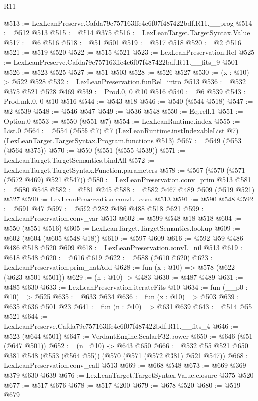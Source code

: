\begin{lexlean}{R11}
\begin{coremodule}
@513 := LexLeanPreserve.Cafda79c757163ffe4c6f07f487422bdf.R11.__prog
@514 := @512 @513
@515 := @514 @375
@516 := LexLeanTarget.TargetSyntax.Value
@517 := @6 @516
@518 := @51 @501
@519 := @517 @518
@520 := @2 @516
@521 := @519 @520
@522 := @515 @521
@523 := LexLeanPreservation.Rel
@525 := LexLeanPreserve.Cafda79c757163ffe4c6f07f487422bdf.R11.__fits_9 @501
@526 := @523 @525
@527 := @51 @503
@528 := @526 @527
@530 := (x : @10) -> @522 @528
@532 := LexLeanPreservation.funRel_intro @513
@536 := @532 @375 @521 @528 @469
@539 := Prod.{0, 0} @10 @516
@540 := @6 @539
@543 := Prod.mk.{0, 0} @10 @516
@544 := @543 @18
@546 := @540 (@544 @518)
@547 := @2 @539
@548 := @546 @547
@549 := @536 @548
@550 := Eq.refl.{1}
@551 := Option.{0}
@553 := @550 (@551 @7)
@554 := LexLeanRuntime.index
@555 := List.{0}
@564 := @554
    (@555 @7)
    @7
    (LexLeanRuntime.instIndexableList @7)
    (LexLeanTarget.TargetSyntax.Program.functions @513)
@567 := @549 (@553 (@564 @375))
@570 := @550 (@551 (@555 @539))
@571 := LexLeanTarget.TargetSemantics.bindAll
@572 := LexLeanTarget.TargetSyntax.Function.parameters
@578 := @567 (@570 (@571 (@572 @469) @521 @547))
@580 := LexLeanPreservation.conv_prim @513
@581 := @580 @548
@582 := @581 @245
@588 := @582 @467 @489 @509 (@519 @521) @527
@590 := LexLeanPreservation.convL_cons @513
@591 := @590 @548
@592 := @591 @47
@597 := @592 @282 @486 @488 @518 @521
@599 := LexLeanPreservation.conv_var @513
@602 := @599 @548 @18 @518
@604 := @550 (@551 @516)
@605 := LexLeanTarget.TargetSemantics.lookup
@609 := @602 (@604 (@605 @548 @18))
@610 := @597 @609
@616 := @592 @59 @486 @486 @518 @520 @609
@618 := LexLeanPreservation.convL_nil @513
@619 := @618 @548
@620 := @616 @619
@622 := @588 (@610 @620)
@623 := LexLeanPreservation.prim_natAdd
@628 := fun (x : @10) => @578 (@622 (@623 @501 @501))
@629 := (n : @10) -> @483
@630 := @487 @489
@631 := @485 @630
@633 := LexLeanPreservation.iterateFits @10
@634 := fun (__p0 : @10) => @525
@635 := @633 @634
@636 := fun (x : @10) => @503
@639 := @635 @636 @501 @23
@641 := fun (n : @10) => @631 @639
@643 := @514 @55 @521
@644 := LexLeanPreserve.Cafda79c757163ffe4c6f07f487422bdf.R11.__fits_4
@646 := @523 (@644 @501)
@647 := VerdantEngine.ScalarF32.power
@650 := @646 (@51 (@647 @501))
@652 := (n : @10) -> @643 @650
@666 := @532 @55 @521 @650 @381 @548 (@553 (@564 @55)) (@570 (@571 (@572 @381) @521 @547))
@668 := LexLeanPreservation.conv_call @513
@669 := @668 @548
@673 := @669 @369 @379 @630 @639
@676 := LexLeanTarget.TargetSyntax.Value.closure @375 @520
@677 := @517 @676
@678 := @517 @200
@679 := @678 @520
@680 := @519 @679

\end{coremodule}
\end{lexlean}

